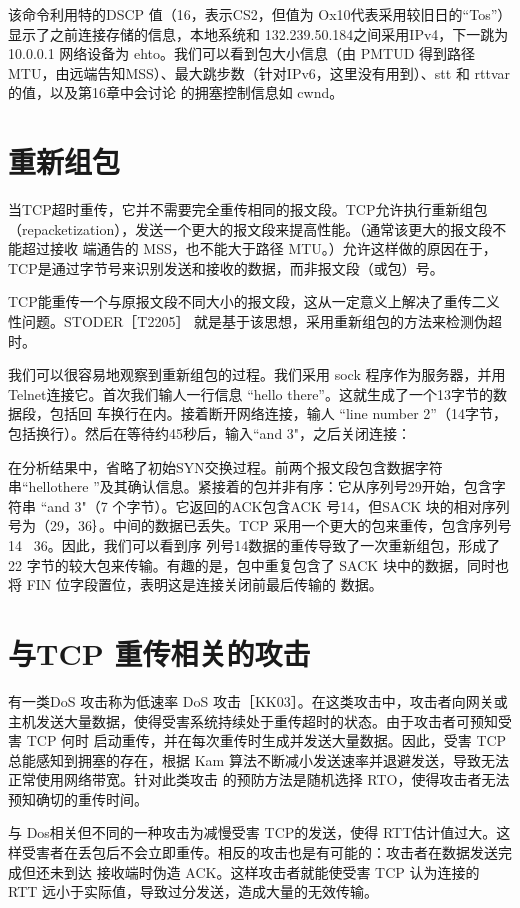 该命令利用特的DSCP 值（16，表示CS2，但值为 Ox10代表采用较旧日的“Tos”）显示了之前连接存储的信息，本地系统和 132.239.50.184之间采用IPv4，下一跳为10.0.0.1
网络设备为 ehto。我们可以看到包大小信息（由 PMTUD 得到路径MTU，由远端告知MSS）、最大跳步数（针对IPv6，这里没有用到）、stt 和 rttvar 的值，以及第16章中会讨论
的拥塞控制信息如 cwnd。

\section{重新组包}

当TCP超时重传，它并不需要完全重传相同的报文段。TCP允许执行重新组包（repacketization），发送一个更大的报文段来提高性能。（通常该更大的报文段不能超过接收
端通告的 MSS，也不能大于路径 MTU。）允许这样做的原因在于，TCP是通过字节号来识别发送和接收的数据，而非报文段（或包）号。

TCP能重传一个与原报文段不同大小的报文段，这从一定意义上解决了重传二义性问题。STODER［T2205］ 就是基于该思想，采用重新组包的方法来检测伪超时。

我们可以很容易地观察到重新组包的过程。我们采用 sock 程序作为服务器，并用 Telnet连接它。首次我们输人一行信息 “hello there”。这就生成了一个13字节的数据段，包括回
车换行在内。接着断开网络连接，输人 “line number 2”（14字节，包括换行）。然后在等待约45秒后，输入“and 3"，之后关闭连接：

在分析结果中，省略了初始SYN交换过程。前两个报文段包含数据字符串“hellothere ”及其确认信息。紧接着的包并非有序：它从序列号29开始，包含字符串 “and 3"（7
个字节）。它返回的ACK包含ACK 号14，但SACK 块的相对序列号为（29，36｝。中间的数据已丢失。TCP 采用一个更大的包来重传，包含序列号14 ~36。因此，我们可以看到序
列号14数据的重传导致了一次重新组包，形成了 22 字节的较大包来传输。有趣的是，包中重复包含了 SACK 块中的数据，同时也将 FIN 位字段置位，表明这是连接关闭前最后传输的
数据。

\section{与TCP 重传相关的攻击}
有一类DoS 攻击称为低速率 DoS 攻击［KK03］。在这类攻击中，攻击者向网关或主机发送大量数据，使得受害系统持续处于重传超时的状态。由于攻击者可预知受害 TCP 何时
启动重传，并在每次重传时生成并发送大量数据。因此，受害 TCP 总能感知到拥塞的存在，根据 Kam 算法不断减小发送速率并退避发送，导致无法正常使用网络带宽。针对此类攻击
的预防方法是随机选择 RTO，使得攻击者无法预知确切的重传时间。

与 Dos相关但不同的一种攻击为减慢受害 TCP的发送，使得 RTT估计值过大。这样受害者在丢包后不会立即重传。相反的攻击也是有可能的：攻击者在数据发送完成但还未到达
接收端时伪造 ACK。这样攻击者就能使受害 TCP 认为连接的 RTT 远小于实际值，导致过分发送，造成大量的无效传输。


